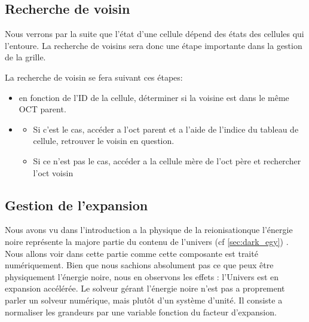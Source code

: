 

\subsection{Recherche de voisin}
Nous verrons par la suite que l'état d'une cellule dépend des états des cellules qui l'entoure.
La recherche de voisins sera donc une étape importante dans la gestion de la grille.

La recherche de voisin se fera suivant ces étapes:

\begin{itemize}
\item en fonction de l'ID de la cellule, déterminer si la voisine est dans le même OCT parent.

\item
\begin{itemize}
\item Si c'est le cas, accéder a l'oct parent et a l'aide de l'indice du tableau de cellule, retrouver le voisin en question.
\item Si ce n'est pas le cas, accéder a la cellule mère de l'oct père et rechercher l'oct voisin
\end{itemize}

\end{itemize}

\subsection{Gestion de l'expansion}
\label{sec:supercomobil}

Nous avons vu dans l'introduction a la physique de la reionisationque l'énergie noire représente la majore partie du contenu de l'univers (cf \ref{sec:dark_egy}) .
Nous allons voir dans cette partie comme cette composante est traité numériquement.
Bien que nous sachions absolument pas ce que peux être physiquement l'énergie noire, nous en observons les effets : l'Univers est en expansion accélérée.
Le solveur gérant l'énergie noire n'est pas a proprement parler un solveur numérique, mais plutôt d'un système d'unité. %
Il consiste a normaliser les grandeurs par une variable fonction du facteur d'expansion.

